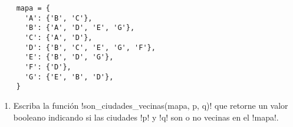 
\begin{minipage}[T]{.45\textwidth}
\end{minipage}
%
\begin{minipage}[T]{.45\textwidth}
  \begin{lstlisting}
    mapa = {
      'A': {'B', 'C'},
      'B': {'A', 'D', 'E', 'G'},
      'C': {'A', 'D'},
      'D': {'B', 'C', 'E', 'G', 'F'},
      'E': {'B', 'D', 'G'},
      'F': {'D'},
      'G': {'E', 'B', 'D'},
    }
  \end{lstlisting}
\end{minipage}

\begin{enumerate}
  \item
    Escriba la función \li!son_ciudades_vecinas(mapa, p, q)!
    que retorne un valor booleano
    indicando si las ciudades \li!p! y \li!q!
    son o no vecinas en el \li!mapa!.

\end{enumerate}

